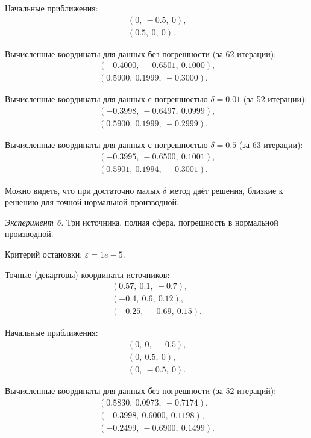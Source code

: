 Начальные приближения:
\begin{align}
(0,\ -0.5,\ 0) \text{,}\nonumber\\
(0.5,\ 0,\ 0) \text{.}\nonumber
\end{align}

Вычисленные координаты для данных без погрешности (за 62 итерации):
\begin{align}
(-0.4000,\ -0.6501,\ 0.1000) \text{,}\nonumber\\
(0.5900,\ 0.1999,\ -0.3000) \text{.}\nonumber
\end{align}

Вычисленные координаты для данных с погрешностью $\delta=0.01$ (за 52 итерации):
\begin{align}
(-0.3998,\ -0.6497,\ 0.0999) \text{,}\nonumber\\
(0.5900,\ 0.1999,\ -0.2999) \text{.}\nonumber
\end{align}

Вычисленные координаты для данных с погрешностью $\delta=0.5$ (за 63 итерации):
\begin{align}
(-0.3995,\ -0.6500,\ 0.1001) \text{,}\nonumber\\
(0.5901,\ 0.1994,\ -0.3001) \text{.}\nonumber
\end{align}

Можно видеть, что при достаточно малых $\delta$ метод даёт решения, близкие к решению для точной нормальной производной.

\emph{Эксперимент 6.} Три источника, полная сфера, погрешность в нормальной производной.

Критерий остановки: $\varepsilon = 1e-5$.

Точные (декартовы) координаты источников:
\begin{align}
    (0.57,\ 0.1,\ -0.7) \text{,}\nonumber\\
    (-0.4,\ 0.6,\ 0.12) \text{,}\nonumber\\
    (-0.25,\ -0.69,\ 0.15) \text{.}\nonumber
\end{align}

Начальные приближения:
\begin{align}
    (0,\ 0,\ -0.5) \text{,}\nonumber\\
    (0,\ 0.5,\ 0) \text{,}\nonumber\\
    (0,\ -0.5,\ 0) \text{.}\nonumber
\end{align}

Вычисленные координаты для данных без погрешности (за 52 итераций):
\begin{align}
    (0.5830,\ 0.0973,\ -0.7174) \text{,}\nonumber\\
    (-0.3998,\ 0.6000,\ 0.1198) \text{,}\nonumber\\
    (-0.2499,\ -0.6900,\ 0.1499) \text{.}\nonumber
\end{align}

